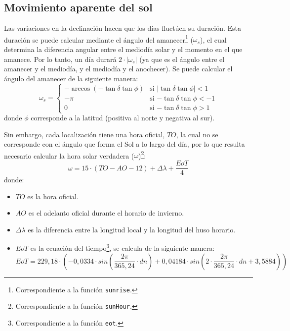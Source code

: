 \subsection{Movimiento aparente del sol}
\label{sec:org8149430}
Las variaciones en la declinación hacen que los días fluctúen su duración. Esta duración se puede calcular mediante el ángulo del amanecer\footnote{Correspondiente a la función \texttt{sunrise}.} (\(\omega_s\)), el cual determina la diferencia angular entre el mediodía solar y el momento en el que amanece. Por lo tanto, un día durará \(2\cdot |\omega_s|\) (ya que es el ángulo entre el amanecer y el mediodía, y el mediodía y el anochecer). Se puede calcular el ángulo del amanecer de la siguiente manera: 
\begin{equation}
  \omega_s=\begin{cases}
  -\arccos(-\tan\delta\tan\phi)& \text{si $|\tan\delta\tan\phi|<1$}\\
  -\pi& \text{si $-\tan\delta\tan\phi<-1$}\\
  0& \text{si $-\tan\delta\tan\phi>1$}
  \end{cases}
\end{equation}
donde \(\phi\) corresponde a la latitud (positiva al norte y negativa al sur). 

Sin embargo, cada localización tiene una hora oficial, \(TO\), la cual no se corresponde con el ángulo que forma el Sol a lo largo del día, por lo que resulta necesario calcular la hora solar verdadera (\(\omega\))\footnote{Correspondiente a la función \texttt{sunHour}.}:  
\begin{equation}
\omega = 15 \cdot (TO-AO-12)+\Delta \lambda + \frac{EoT}{4}
\end{equation}
donde:
\begin{itemize}
\item \(TO\) es la hora oficial.
\item \(AO\) es el adelanto oficial durante el horario de invierno. 
\item \(\Delta \lambda\) es la diferencia entre la longitud local y la longitud del huso horario. 
\item \(EoT\) es la ecuación del tiempo\footnote{Correspondiente a la función \texttt{eot}.}, se calcula de la siguiente manera: 
\begin{equation}
EoT=229,18\cdot (-0,0334\cdot sin(\frac{2\pi}{365,24}\cdot dn)+0,04184\cdot sin(2\cdot \frac{2\pi}{365,24}\cdot dn+3,5884))
\end{equation}
\end{itemize}

